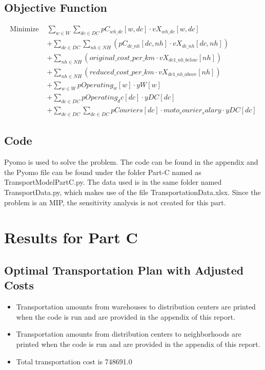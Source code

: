 \documentclass[12pt]{article}
\begin{document}
\subsection*{Objective Function}
\begin{align*}
\text{Minimize } & \sum_{w \in W} \sum_{dc \in DC} pC_{wh\_dc}[w, dc] \cdot vX_{wh\_dc}[w, dc] \\
& + \sum_{dc \in DC} \sum_{nh \in NH} \left( pC_{dc\_nh}[dc, nh] \cdot vX_{dc\_nh}[dc, nh] \right) \\
& + \sum_{nh \in NH} \left( original\_cost\_per\_km \cdot vX_{dc1\_nh\_below}[nh] \right) \\
& + \sum_{nh \in NH} \left( reduced\_cost\_per\_km \cdot vX_{dc1\_nh\_above}[nh] \right) \\
& + \sum_{w \in W} pOperating_w[w] \cdot yW[w] \\
& + \sum_{dc \in DC} pOperating_dc[dc] \cdot yDC[dc] \\
& + \sum_{dc \in DC} \sum_{dc \in DC} pCouriers[dc] \cdot moto_courier_salary \cdot yDC[dc]
\end{align*}

\subsection*{Code}
Pyomo is used to solve the problem. The code can be found in the appendix and the Pyomo file can be found under the folder Part-C named as TransportModelPartC.py. The data used is in the same folder named TransportData.py, which makes use of the file TransportationData.xlsx. Since the problem is an MIP, the sensitivity analysis is not created for this part.

\section*{Results for Part C}
\subsection*{Optimal Transportation Plan with Adjusted Costs}
\begin{itemize}
    \item Transportation amounts from warehouses to distribution centers are printed when the code is run and are provided in the appendix of this report.
    \item Transportation amounts from distribution centers to neighborhoods are printed when the code is run and are provided in the appendix of this report.
    \item Total transportation cost is 748691.0
\end{itemize}
\end{document}

